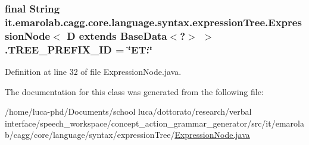 \hypertarget{classit_1_1emarolab_1_1cagg_1_1core_1_1language_1_1syntax_1_1expressionTree_1_1ExpressionNode_3_3eaf7c0f6a4bc47f4823e05ca883c5af_acacfa76d0065802ab1b3423e8318aa44}{
\subsubsection[{T\-R\-E\-E\-\_\-\-P\-R\-E\-F\-I\-X\-\_\-\-I\-D}]{\setlength{\rightskip}{0pt plus 5cm}final String it.\-emarolab.\-cagg.\-core.\-language.\-syntax.\-expression\-Tree.\-Expression\-Node$<$ D extends Base\-Data$<$?$>$ $>$.T\-R\-E\-E\-\_\-\-P\-R\-E\-F\-I\-X\-\_\-\-I\-D = \char`\"{}E\-T\-:\char`\"{}\hspace{0.3cm}{\ttfamily [static]}}}\label{classit_1_1emarolab_1_1cagg_1_1core_1_1language_1_1syntax_1_1expressionTree_1_1ExpressionNode_3_3eaf7c0f6a4bc47f4823e05ca883c5af_acacfa76d0065802ab1b3423e8318aa44}


Definition at line 32 of file Expression\-Node.\-java.



The documentation for this class was generated from the following file\-:\begin{DoxyCompactItemize}
\item 
/home/luca-\/phd/\-Documents/school luca/dottorato/research/verbal interface/speech\-\_\-workspace/concept\-\_\-action\-\_\-grammar\-\_\-generator/src/it/emarolab/cagg/core/language/syntax/expression\-Tree/\hyperlink{ExpressionNode_8java}{Expression\-Node.\-java}\end{DoxyCompactItemize}
